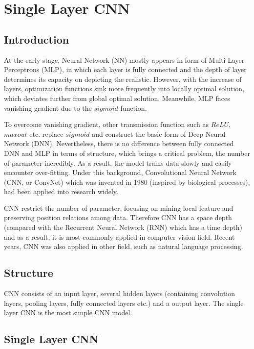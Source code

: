\documentclass[12pt, a4paper, UTF8]{article}
\begin{document}
	\section{Single Layer CNN}
	\subsection{Introduction}
	\noindent At the early stage, Neural Network (NN) mostly appears in form of Multi-Layer Perceptrons (MLP), in which each layer is fully connected and the depth of layer determines its capacity on depicting the realistic. However, with the increase of layers, optimization functions sink more frequently into locally optimal solution, which deviates further from global optimal solution. Meanwhile, MLP faces vanishing gradient due to the $sigmoid$ function.
	\par To overcome vanishing gradient, other transmission function such as $ReLU$, $maxout$ etc. replace $sigmoid$ and construct the basic form of Deep Neural Network (DNN). Nevertheless, there is no difference between fully connected DNN and MLP in terms of structure, which brings a critical problem, the number of parameter incredibly. As a result, the model trains data slowly and easily encounter over-fitting. Under this background, Convolutional Neural Network (CNN, or ConvNet) which was invented in 1980 (inspired by biological processes), had been applied into research widely.
	\par CNN restrict the number of parameter, focusing on mining local feature and preserving position relations among data. Therefore CNN has a space depth (compared with the Recurrent Neural Network (RNN) which has a time depth) and as a result, it is most commonly applied in computer vision field. Recent years, CNN was also applied in other field, such as natural language processing.
	
	\subsection{Structure}
	\noindent CNN consists of an input layer, several hidden layers (containing convolution layers, pooling layers, fully connected layers etc.) and a output layer. The single layer CNN is the most simple CNN model.
	
	\subsection{Single Layer CNN}
\end{document}
